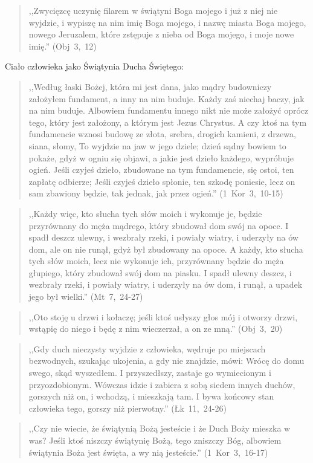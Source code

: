 \documentclass[10pt,a4paper,oneside]{article}
\begin{document}
\begin{quote}
,,Zwycięzcę uczynię filarem w świątyni Boga mojego i już z niej nie wyjdzie, i wypiszę na nim imię Boga mojego, i nazwę miasta Boga mojego, nowego Jeruzalem, które zstępuje z nieba od Boga mojego, i moje nowe imię.'' (Obj~3,~12)
\end{quote}
Ciało człowieka jako Świątynia Ducha Świętego:
\begin{quote}
,,Według łaski Bożej, która mi jest dana, jako mądry budowniczy założyłem fundament, a inny na nim buduje. Każdy zaś niechaj baczy, jak na nim buduje. Albowiem fundamentu innego nikt nie może założyć oprócz tego, który jest założony, a którym jest Jezus Chrystus. A czy ktoś na tym fundamencie wznosi budowę ze złota, srebra, drogich kamieni, z drzewa, siana, słomy, To wyjdzie na jaw w jego dziele; dzień sądny bowiem to pokaże, gdyż w ogniu się objawi, a jakie jest dzieło każdego, wypróbuje ogień. Jeśli czyjeś dzieło, zbudowane na tym fundamencie, się ostoi, ten zapłatę odbierze; Jeśli czyjeś dzieło spłonie, ten szkodę poniesie, lecz on sam zbawiony będzie, tak jednak, jak przez ogień.'' (1~Kor~3,~10-15)
\end{quote}
\begin{quote}
,,Każdy więc, kto słucha tych słów moich i wykonuje je, będzie przyrównany do męża mądrego, który zbudował dom swój na opoce. I spadł deszcz ulewny, i wezbrały rzeki, i powiały wiatry, i uderzyły na ów dom, ale on nie runął, gdyż był zbudowany na opoce. A każdy, kto słucha tych słów moich, lecz nie wykonuje ich, przyrównany będzie do męża głupiego, który zbudował swój dom na piasku. I spadł ulewny deszcz, i wezbrały rzeki, i powiały wiatry, i uderzyły na ów dom, i runął, a upadek jego był wielki.'' (Mt~7,~24-27)
\end{quote}
\begin{quote}
,,Oto stoję u drzwi i kołaczę; jeśli ktoś usłyszy głos mój i otworzy drzwi, wstąpię do niego i będę z nim wieczerzał, a on ze mną.'' (Obj~3,~20)
\end{quote}
\begin{quote}
,,Gdy duch nieczysty wyjdzie z człowieka, wędruje po miejscach bezwodnych, szukając ukojenia, a gdy nie znajdzie, mówi: Wrócę do domu swego, skąd wyszedłem. I przyszedłszy, zastaje go wymiecionym i przyozdobionym. Wówczas idzie i zabiera z sobą siedem innych duchów, gorszych niż on, i wchodzą, i mieszkają tam. I bywa końcowy stan człowieka tego, gorszy niż pierwotny.'' (Łk~11,~24-26)
\end{quote}
\begin{quote}
,,Czy nie wiecie, że świątynią Bożą jesteście i że Duch Boży mieszka w was? Jeśli ktoś niszczy świątynię Bożą, tego zniszczy Bóg, albowiem świątynia Boża jest święta, a wy nią jesteście.'' (1~Kor~3,~16-17)
\end{quote}
\end{document}
